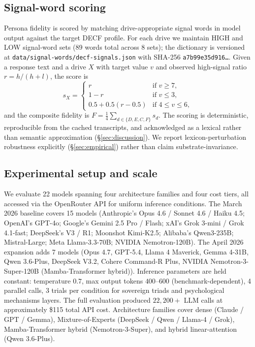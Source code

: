 \documentclass{article}
\begin{document}
\subsection{Signal-word scoring}
\label{sec:dataset:scoring}
Persona fidelity is scored by matching drive-appropriate signal words in model output against the target DECF profile. For each drive we maintain HIGH and LOW signal-word sets (89 words total across 8 sets); the dictionary is versioned at \texttt{data/signal-words/decf-signals.json} with SHA-256 \texttt{a7b99e35d916\ldots}. Given a response text and a drive $X$ with target value $v$ and observed high-signal ratio $r = h/(h + l)$, the score is
\[
s_X = \begin{cases}
r & \text{if } v \geq 7, \\
1 - r & \text{if } v \leq 3, \\
0.5 + 0.5(r - 0.5) & \text{if } 4 \leq v \leq 6,
\end{cases}
\]
and the composite fidelity is $F = \tfrac{1}{4}\sum_{d \in \{D,E,C,F\}} s_d$. The scoring is deterministic, reproducible from the cached transcripts, and acknowledged as a lexical rather than semantic approximation (\S\ref{sec:discussion}). We report lexicon-perturbation robustness explicitly (\S\ref{sec:empirical}) rather than claim substrate-invariance.

\subsection{Experimental setup and scale}
\label{sec:dataset:setup}
We evaluate 22 models spanning four architecture families and four cost tiers, all accessed via the OpenRouter API for uniform inference conditions. The March 2026 baseline covers 15 models (Anthropic's Opus 4.6 / Sonnet 4.6 / Haiku 4.5; OpenAI's GPT-4o; Google's Gemini 2.5 Pro / Flash; xAI's Grok 3-mini / Grok 4.1-fast; DeepSeek's V3 / R1; Moonshot Kimi-K2.5; Alibaba's Qwen3-235B; Mistral-Large; Meta Llama-3.3-70B; NVIDIA Nemotron-120B). The April 2026 expansion adds 7 models (Opus 4.7, GPT-5.4, Llama 4 Maverick, Gemma 4-31B, Qwen 3.6-Plus, DeepSeek V3.2, Cohere Command-R Plus, NVIDIA Nemotron-3-Super-120B (Mamba-Transformer hybrid)). Inference parameters are held constant: temperature $0.7$, max output tokens $400$--$600$ (benchmark-dependent), 4 parallel calls, 3 trials per condition for sovereign triads and psychological mechanisms layers. The full evaluation produced $22{,}200+$ LLM calls at approximately \$115 total API cost. Architecture families cover dense (Claude / GPT / Gemma), Mixture-of-Experts (DeepSeek / Qwen / Llama-4 / Grok), Mamba-Transformer hybrid (Nemotron-3-Super), and hybrid linear-attention (Qwen 3.6-Plus).
\end{document}
